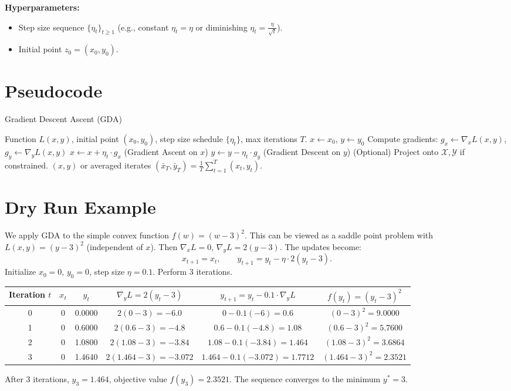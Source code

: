\documentclass{article}
\begin{document}
\textbf{Hyperparameters:}
\begin{itemize}
    \item Step size sequence $\{\eta_t\}_{t \ge 1}$ (e.g., constant $\eta_t = \eta$ or diminishing $\eta_t = \frac{\eta}{\sqrt{t}}$).
    \item Initial point $z_0 = (x_0, y_0)$.
\end{itemize}

\section*{Pseudocode}
\begin{algorithm}[H]
\caption{Gradient Descent Ascent (GDA)}
\begin{algorithmic}
\REQUIRE Function $L(x,y)$, initial point $(x_0, y_0)$, step size schedule $\{\eta_t\}$, max iterations $T$.
\STATE $x \gets x_0$, $y \gets y_0$
    \STATE Compute gradients: $g_x \gets \nabla_x L(x, y)$, $g_y \gets \nabla_y L(x, y)$
    \STATE $x \gets x + \eta_t \cdot g_x$ \quad (Gradient Ascent on $x$)
    \STATE $y \gets y - \eta_t \cdot g_y$ \quad (Gradient Descent on $y$)
    \STATE (Optional) Project onto $\mathcal{X}, \mathcal{Y}$ if constrained.
\ENDFOR
\RETURN $(x, y)$ or averaged iterates $(\bar{x}_T, \bar{y}_T) = \frac{1}{T}\sum_{t=1}^T (x_t, y_t)$.
\end{algorithmic}
\end{algorithm}

\section*{Dry Run Example}
We apply GDA to the simple convex function $f(w) = (w-3)^2$. This can be viewed as a saddle point problem with $L(x,y) = (y-3)^2$ (independent of $x$). Then $\nabla_x L = 0$, $\nabla_y L = 2(y-3)$. The updates become:
\[
x_{t+1} = x_t, \qquad y_{t+1} = y_t - \eta \cdot 2(y_t - 3).
\]
Initialize $x_0 = 0$, $y_0 = 0$, step size $\eta = 0.1$. Perform 3 iterations.

\begin{center}
\begin{tabular}{c|c|c|c|c|c}
Iteration $t$ & $x_t$ & $y_t$ & $\nabla_y L = 2(y_t-3)$ & $y_{t+1} = y_t - 0.1 \cdot \nabla_y L$ & $f(y_t) = (y_t-3)^2$ \\
\hline
0 & 0 & 0.0000 & $2(0-3) = -6.0$ & $0 - 0.1(-6) = 0.6$ & $(0-3)^2 = 9.0000$ \\
1 & 0 & 0.6000 & $2(0.6-3) = -4.8$ & $0.6 - 0.1(-4.8) = 1.08$ & $(0.6-3)^2 = 5.7600$ \\
2 & 0 & 1.0800 & $2(1.08-3) = -3.84$ & $1.08 - 0.1(-3.84) = 1.464$ & $(1.08-3)^2 = 3.6864$ \\
3 & 0 & 1.4640 & $2(1.464-3) = -3.072$ & $1.464 - 0.1(-3.072) = 1.7712$ & $(1.464-3)^2 = 2.3521$ \\
\end{tabular}
\end{center}
After 3 iterations, $y_3 = 1.464$, objective value $f(y_3) = 2.3521$. The sequence converges to the minimum $y^* = 3$.
\end{document}
